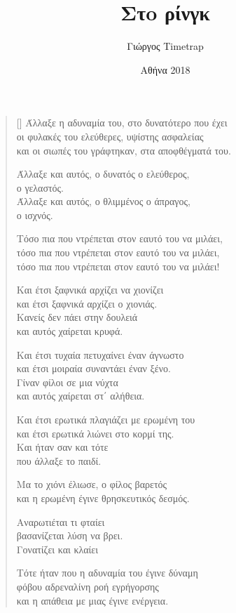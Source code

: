 \documentclass[12pt]{article}
\title{Στo ρίνγκ}
\date{Αθήνα 2018}
\author{Γιώργος \latintext Timetrap}
\begin{document}
\maketitle
\newpage

\settowidth{\versewidth}{Τόσο πια που ντρέπεται στον εαυτό του να μιλάει}
\begin{verse}[\versewidth]
  Άλλαξε η αδυναμία του, στο δυνατότερο που έχει \\
  οι φυλακές του ελεύθερες, υψίστης ασφαλείας \\
  και οι σιωπές του γράφτηκαν, στα αποφθέγματά του.

  Άλλαξε και αυτός, ο δυνατός ο ελεύθερος, \\
  ο γελαστός. \\
  Άλλαξε και αυτός, ο θλιμμένος ο άπραγος, \\
  ο ισχνός.

  Τόσο πια που ντρέπεται στον εαυτό του να μιλάει, \\
  τόσο πια που ντρέπεται στον εαυτό του να μιλάει, \\
  τόσο πια που ντρέπεται στον εαυτό του να μιλάει!

  Και έτσι ξαφνικά αρχίζει να χιονίζει \\
  και έτσι ξαφνικά αρχίζει ο χιονιάς. \\
  Κανείς δεν πάει στην δουλειά \\
  και αυτός χαίρεται κρυφά.

  Και έτσι τυχαία πετυχαίνει έναν άγνωστο \\
  και έτσι μοιραία συναντάει έναν ξένο. \\
  Γίναν φίλοι σε μια νύχτα \\
  και αυτός χαίρεται στ΄ αλήθεια.

  Και έτσι ερωτικά πλαγιάζει με ερωμένη του \\
  και έτσι ερωτικά λιώνει στο κορμί της. \\
  Και ήταν σαν και τότε \\
  που άλλαξε το παιδί.

  Μα το χιόνι έλιωσε, ο φίλος βαρετός \\
  και η ερωμένη έγινε θρησκευτικός δεσμός.

  Αναρωτιέται τι φταίει \\
  βασανίζεται λύση να βρει. \\
  Γονατίζει και κλαίει

  Τότε ήταν που η αδυναμία του έγινε δύναμη \\
  φόβου αδρεναλίνη ροή εγρήγορσης \\
  και η απάθεια με μιας έγινε ενέργεια. \\


\end{verse}
\end{document}
